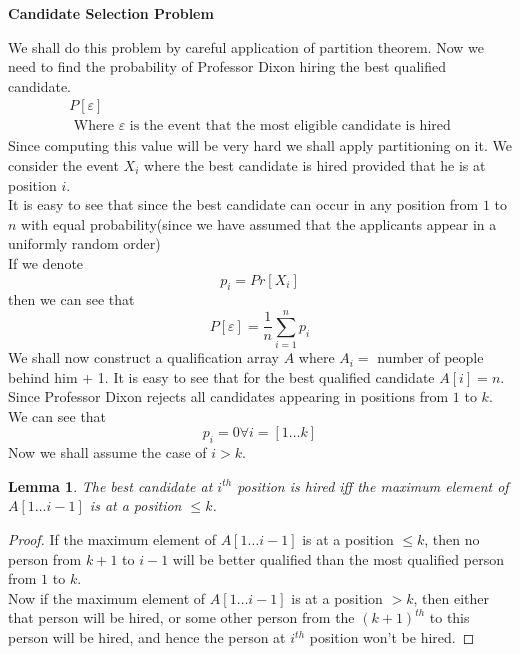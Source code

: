\documentclass{assignment}
\begin{document}
\begin{problemlist}
\pbitem
\begin{problem}
\textbf{Candidate Selection Problem}
\begin{answer}

We shall do this problem by careful application of partition theorem. Now we need to find the probability of Professor Dixon hiring the best qualified candidate. 
\begin{eqnarray}
 P[\varepsilon ] \\ 
\textrm{ Where } \varepsilon \textrm{ is the event that the most eligible candidate is hired} \nonumber
\end{eqnarray}
Since computing this value will be very hard we shall apply partitioning on it. We consider the event $X_i$ where the best candidate is hired provided that he is at position $i$. \\
It is easy to see that since the best candidate can occur in any position from $1$ to $n$ with equal probability(since we have assumed that the applicants appear in a uniformly random order) \\
If we denote 
\begin{equation}
 p_i=Pr[X_i]
\end{equation}
then we can see that 
\begin{equation}
  P[\varepsilon ] = \frac{1}{n} \sum_{i=1}^{n} p_i
\end{equation}
We shall now construct a qualification array $A$ where $A_i =$ number of people behind him + 1. It is easy to see that for the best qualified candidate $A[i]=n$. \\
Since Professor Dixon rejects all candidates appearing in positions from $1$ to $k$. We can see that 
\begin{equation}
 p_i = 0 \forall i = [1 \ldots k]
\end{equation}
Now we shall assume the case of $i>k$. 


\newtheorem{lem}{Lemma}
\begin{lem}
The best candidate at $i^{th}$ position is hired iff the maximum element of $A[1 \ldots i-1]$ is at a position $\leq k$.  
\end{lem}
\begin{proof}
If the maximum element of $A[1 \ldots i-1]$ is at a position $\leq k$, then no person from $k+1$ to $i-1$ will be better qualified than the most qualified person from $1$ to $k$. \\
Now if the maximum element of  $A[1 \ldots i-1]$ is at a position $> k$, then either that person will be hired, or some other person from the $(k+1)^{th}$ to this person will be hired, and hence the person at $i^{th}$ position won't be hired. 
\end{proof}


\end{answer}
\end{problem}
\end{problemlist}
\end{document}
